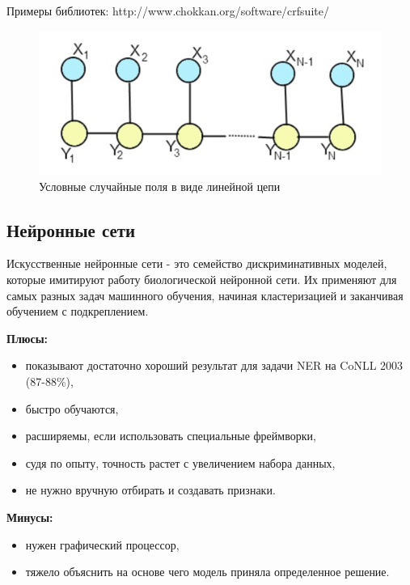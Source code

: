       Примеры библиотек: http://www.chokkan.org/software/crfsuite/

      \begin{figure}
      \centering
      \includegraphics[width=\textwidth]{figures/crf.png}
      \caption{Условные случайные поля в виде линейной цепи}
      \label{fig:crf}
      \end{figure}

    \subsection{Нейронные сети}
      Искусственные нейронные сети - это семейство дискриминативных моделей, которые
      имитируют работу биологической нейронной сети. Их применяют для самых разных задач
      машинного обучения, начиная кластеризацией и заканчивая обучением с подкреплением.

      \textbf{Плюсы:}
        \begin{itemize}
          \item показывают достаточно хороший результат для задачи NER на CoNLL 2003 (87-88\%),
          \item быстро обучаются,
          \item расширяемы, если использовать специальные фреймворки,
          \item судя по опыту, точность растет с увеличением набора данных,
          \item не нужно вручную отбирать и создавать признаки.
        \end{itemize}

      \textbf{Минусы:}
        \begin{itemize}
          \item нужен графический процессор,
          \item тяжело объяснить на основе чего модель приняла определенное решение.
        \end{itemize}

